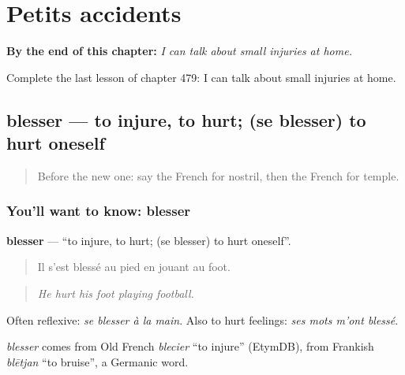 
\chapter{Petits accidents}
\label{ch:fr-petits-accidents}

\begin{chapteropening}
\textbf{By the end of this chapter:} \emph{I can talk about small injuries at home.}

Complete the last lesson of chapter 479: I can talk about small injuries at home.
\end{chapteropening}

\section[blesser]{blesser — to injure, to hurt; (se blesser) to hurt oneself}

\label{lesson:FR-C479-blesser}



\begin{quote}
Before the new one: say the French for nostril, then the French for temple.
\end{quote}

\subsection*{You'll want to know: blesser}
\textbf{blesser} — \textquotedblleft{}to injure, to hurt; (se blesser) to hurt oneself\textquotedblright{}.

\begin{quote}
Il s'est blessé au pied en jouant au foot.
\end{quote}

\begin{quote}
\emph{He hurt his foot playing football.}
\end{quote}

Often reflexive: \emph{se blesser à la main}. Also to hurt feelings: \emph{ses mots m'ont blessé}.

\begin{cousinweb}
\emph{blesser} comes from Old French \emph{blecier} \textquotedblleft{}to injure\textquotedblright{} (EtymDB), from Frankish \emph{blētjan} \textquotedblleft{}to bruise\textquotedblright{}, a Germanic word.
\end{cousinweb}

